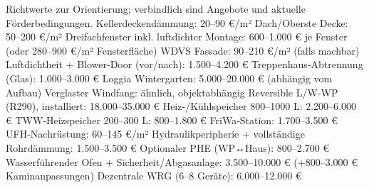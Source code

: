 \markdownRendererDocumentBegin
\markdownRendererSectionBegin
{}\markdownRendererInterblockSeparator
{}Richtwerte zur Orientierung; verbindlich sind Angebote und aktuelle Förderbedingungen.\markdownRendererInterblockSeparator
{}\markdownRendererSectionBegin
{}\markdownRendererInterblockSeparator
{}\markdownRendererUlBeginTight
\markdownRendererUlItem Kellerdeckendämmung: 20–90 €/m²\markdownRendererUlItemEnd 
\markdownRendererUlItem Dach/Oberste Decke: 50–200 €/m²\markdownRendererUlItemEnd 
\markdownRendererUlItem Dreifachfenster inkl. luftdichter Montage: 600–1.000 € je Fenster (oder 280–900 €/m² Fensterfläche)\markdownRendererUlItemEnd 
\markdownRendererUlItem WDVS Fassade: 90–210 €/m² (falls machbar)\markdownRendererUlItemEnd 
\markdownRendererUlItem Luftdichtheit + Blower‑Door (vor/nach): 1.500–4.200 €\markdownRendererUlItemEnd 
\markdownRendererUlItem Treppenhaus‑Abtrennung (Glas): 1.000–3.000 €\markdownRendererUlItemEnd 
\markdownRendererUlItem Loggia Wintergarten: 5.000–20.000 € (abhängig vom Aufbau)\markdownRendererUlItemEnd 
\markdownRendererUlItem Verglaster Windfang: ähnlich, objektabhängig\markdownRendererUlItemEnd 
\markdownRendererUlEndTight \markdownRendererInterblockSeparator
{}
\markdownRendererSectionEnd \markdownRendererSectionBegin
{}\markdownRendererInterblockSeparator
{}\markdownRendererUlBeginTight
\markdownRendererUlItem Reversible L/W‑WP (R290), installiert: 18.000–35.000 €\markdownRendererUlItemEnd 
\markdownRendererUlItem Heiz-/Kühlspeicher 800–1000 L: 2.200–6.000 €\markdownRendererUlItemEnd 
\markdownRendererUlItem TWW‑Heizspeicher 200–300 L: 800–1.800 €\markdownRendererUlItemEnd 
\markdownRendererUlItem FriWa‑Station: 1.700–3.500 €\markdownRendererUlItemEnd 
\markdownRendererUlItem UFH‑Nachrüstung: 60–145 €/m²\markdownRendererUlItemEnd 
\markdownRendererUlItem Hydraulikperipherie + vollständige Rohrdämmung: 1.500–3.500 €\markdownRendererUlItemEnd 
\markdownRendererUlItem Optionaler PHE (WP↔Haus): 800–2.700 €\markdownRendererUlItemEnd 
\markdownRendererUlItem Wasserführender Ofen + Sicherheit/Abgasanlage: 3.500–10.000 € (+800–3.000 € Kaminanpassungen)\markdownRendererUlItemEnd 
\markdownRendererUlEndTight \markdownRendererInterblockSeparator
{}
\markdownRendererSectionEnd \markdownRendererSectionBegin
{}\markdownRendererInterblockSeparator
{}\markdownRendererUlBeginTight
\markdownRendererUlItem Dezentrale WRG (6–8 Geräte): 6.000–12.000 €\markdownRendererUlItemEnd 
